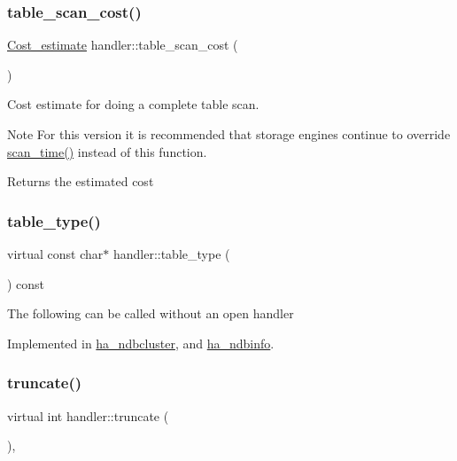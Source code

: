 \subsubsection{\texorpdfstring{table\+\_\+scan\+\_\+cost()}{table\_scan\_cost()}}
{\footnotesize\ttfamily \mbox{\hyperlink{classCost__estimate}{Cost\+\_\+estimate}} handler\+::table\+\_\+scan\+\_\+cost (\begin{DoxyParamCaption}{ }\end{DoxyParamCaption})\hspace{0.3cm}{\ttfamily [virtual]}}

Cost estimate for doing a complete table scan.

\begin{DoxyNote}{Note}
For this version it is recommended that storage engines continue to override \mbox{\hyperlink{classhandler_a65f8e5188e2bd9636a564bbc0c3fef86}{scan\+\_\+time()}} instead of this function.
\end{DoxyNote}
\begin{DoxyReturn}{Returns}
the estimated cost 
\end{DoxyReturn}
\mbox{\label{classhandler_ad38f5d3f1e026a0af32b5542aa5ac2f9}} 
\subsubsection{\texorpdfstring{table\+\_\+type()}{table\_type()}}
{\footnotesize\ttfamily virtual const char$\ast$ handler\+::table\+\_\+type (\begin{DoxyParamCaption}{ }\end{DoxyParamCaption}) const\hspace{0.3cm}{\ttfamily [pure virtual]}}

The following can be called without an open handler 

Implemented in \mbox{\hyperlink{classha__ndbcluster_a96d160419836ac20e131570a32e1c4a8}{ha\+\_\+ndbcluster}}, and \mbox{\hyperlink{classha__ndbinfo_a4f8caa0e516e62ccce4a5f2a52590548}{ha\+\_\+ndbinfo}}.

\mbox{\label{classhandler_a13fdf15d81c256d3e6a9643532ff2126}} 
\subsubsection{\texorpdfstring{truncate()}{truncate()}}
{\footnotesize\ttfamily virtual int handler\+::truncate (\begin{DoxyParamCaption}{ }\end{DoxyParamCaption})\hspace{0.3cm}{\ttfamily [inline]}, {\ttfamily [virtual]}}

